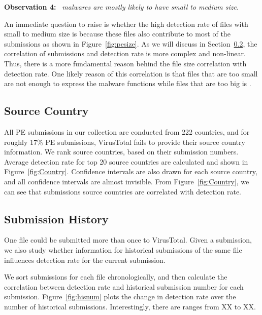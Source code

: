 {\bf Observation 4:} 
{\em \pe\ malwares are mostly likely to have small to medium size.}

An immediate question to raise is whether the high detection rate of files with small to medium size
is because these files also contribute to most of the submissions as shown in Figure~\ref{fig:pesize}.
As we will discuss in Section~\ref{sec:history}, the correlation of submissions and detection rate is more complex and non-linear.
Thus, there is a more fundamental reason behind the file size correlation with detection rate.
One likely reason of this correlation is that files that are too small are not enough to express the
malware functions while files that are too big is .

\subsection{Source Country}
\label{sec:country}

All PE submissions in our collection are conducted from 222 countries, 
and for roughly 17\% PE submissions, 
VirusTotal fails to provide their source country information. 
We rank source countries, based on their submission numbers. 
Average detection rate for top 20 source countries are calculated and shown in 
Figure~\ref{fig:Country}. 
Confidence intervals are also drawn for each source country, 
and all confidence intervals are almost invisible. 
From Figure~\ref{fig:Country}, 
we can see that submissions source countries are correlated with detection rate.

\fi


\subsection{Submission History}
\label{sec:history}

%



One file could be submitted more than once to VirusTotal. 
Given a submission, we also study whether information for historical 
submissions of the same file influences detection rate for the current submission. 

We sort submissions for each file chronologically, 
and then calculate the correlation between detection rate and historical submission number for each submission. 
Figure~\ref{fig:hisnum} plots the change in detection rate over the number of historical submissions.
Interestingly, there are ranges from XX to XX. 

